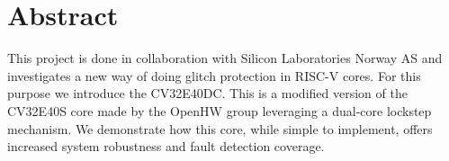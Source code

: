 \chapter{Abstract}




This project is done in collaboration with Silicon Laboratories Norway AS and investigates a new way of doing glitch protection in RISC-V cores. For this purpose we introduce the CV32E40DC. This is a modified version of the CV32E40S core made by the OpenHW group\cite{cv32e40s_manual} leveraging a dual-core lockstep mechanism. We demonstrate how this core, while simple to implement, offers increased system robustness and fault detection coverage.  

